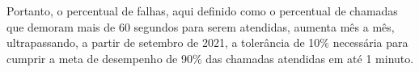 Portanto, o percentual de falhas, aqui definido como o percentual de chamadas que demoram mais de 60 segundos para serem atendidas, aumenta mês a mês, ultrapassando, a partir de setembro de 2021,
a tolerância de 10\% necessária para cumprir a meta de desempenho de 90\% das chamadas atendidas em até 1 minuto.
